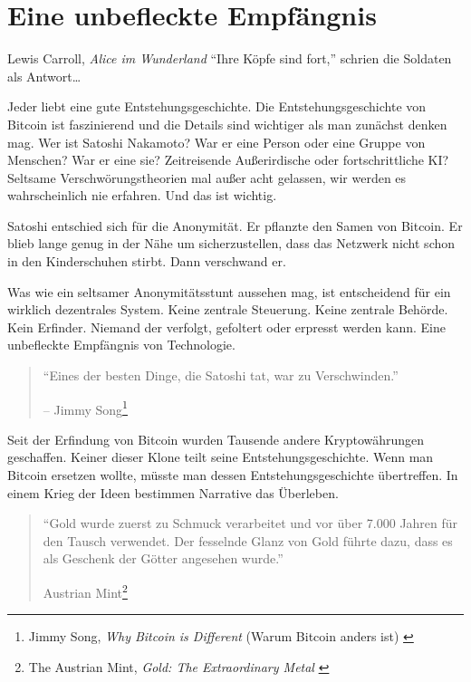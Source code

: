 \chapter{Eine unbefleckte Empfängnis}
\label{les:5}

\begin{chapquote}{Lewis Carroll, \textit{Alice im Wunderland}}
\enquote{Ihre Köpfe sind fort,} schrien die Soldaten als Antwort\ldots
\end{chapquote}

Jeder liebt eine gute Entstehungsgeschichte. Die Entstehungsgeschichte von
Bitcoin ist faszinierend und die Details sind wichtiger als man zunächst denken
mag. Wer ist Satoshi Nakamoto? War er eine Person oder eine Gruppe von Menschen?
War er eine sie? Zeitreisende Außerirdische oder fortschrittliche KI? Seltsame
Verschwörungstheorien mal außer acht gelassen, wir werden es wahrscheinlich nie
erfahren. Und das ist wichtig.

Satoshi entschied sich für die Anonymität. Er pflanzte den Samen von Bitcoin. Er
blieb lange genug in der Nähe um sicherzustellen, dass das Netzwerk nicht schon
in den Kinderschuhen stirbt. Dann verschwand er.

Was wie ein seltsamer Anonymitätsstunt aussehen mag, ist entscheidend für ein
wirklich dezentrales System. Keine zentrale Steuerung. Keine zentrale Behörde.
Kein Erfinder. Niemand der verfolgt, gefoltert oder erpresst werden kann. Eine
unbefleckte Empfängnis von Technologie.

\begin{quotation}\begin{samepage}
\enquote{Eines der besten Dinge, die Satoshi tat, war zu Verschwinden.}
\begin{flushright} -- Jimmy Song\footnote{Jimmy Song, \textit{Why Bitcoin is Different} (Warum Bitcoin anders ist) \cite{bitcoin-different}}
\end{flushright}\end{samepage}\end{quotation}

\newpage

Seit der Erfindung von Bitcoin wurden Tausende andere Kryptowährungen
geschaffen. Keiner dieser Klone teilt seine Entstehungsgeschichte. Wenn man
Bitcoin ersetzen wollte, müsste man dessen Entstehungsgeschichte übertreffen. In
einem Krieg der Ideen bestimmen Narrative das Überleben.

\begin{quotation}\begin{samepage}
\enquote{Gold wurde zuerst zu Schmuck verarbeitet und vor über 7.000 Jahren für
den Tausch verwendet. Der fesselnde Glanz von Gold führte dazu, dass es als
Geschenk der Götter angesehen wurde.}
\begin{flushright} Austrian Mint\footnote{The Austrian Mint, \textit{Gold: The Extraordinary Metal} \cite{gold-gift-gods}}
\end{flushright}\end{samepage}\end{quotation}

